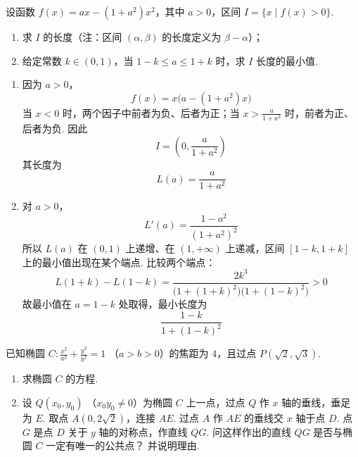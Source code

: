 \begin{problem}
设函数 \( f(x) = ax - (1 + a^2)x^2 \)，其中 \( a > 0 \)，区间 \( I = \{x \mid f(x) > 0\} \).
\begin{enumerate}
\item 求 \(I\) 的长度（注：区间 \((\alpha, \beta)\) 的长度定义为 \(\beta - \alpha\)）；
\item 给定常数 \(k \in (0,1)\)，当 \(1 - k \leqslant a \leqslant 1 + k\) 时，求 \(I\) 长度的最小值.
\end{enumerate}
\end{problem}

\begin{solution}
\begin{enumerate}
\item 因为 \(a>0\)，
\[
f(x)=x\bigl(a-(1+a^2)x\bigr)
\]
当 \(x<0\) 时，两个因子中前者为负、后者为正；当 \(x>\frac{a}{1+a^2}\) 时，前者为正、后者为负. 因此
\[
I=\left(0,\frac{a}{1+a^2}\right)
\]
其长度为
\[
L(a)=\frac{a}{1+a^2}
\]

\item 对 \(a>0\)，
\[
L'(a)=\frac{1-a^2}{(1+a^2)^2}
\]
所以 \(L(a)\) 在 \((0,1)\) 上递增、在 \((1,+\infty)\) 上递减，区间 \([1-k,1+k]\) 上的最小值出现在某个端点. 比较两个端点：
\[
L(1+k)-L(1-k)
=\frac{2k^3}{\bigl(1+(1+k)^2\bigr)\bigl(1+(1-k)^2\bigr)}>0
\]
故最小值在 \(a=1-k\) 处取得，最小长度为
\[
\frac{1-k}{1+(1-k)^2}
\]
\end{enumerate}
\end{solution}

\begin{problem}
已知椭圆 \(C: \frac{x^2}{a^2} + \frac{y^2}{b^2} = 1 \) （\(a > b > 0\)）的焦距为 \(4\)，且过点 \(P(\sqrt{2}, \sqrt{3})\).
\begin{enumerate}
\item 求椭圆 \(C\) 的方程.
\item 设 \(Q(x_0, y_0) \) （\(x_0 y_0 \neq 0\)）为椭圆 \(C\) 上一点，过点 \(Q\) 作 \(x\) 轴的垂线，垂足为 \(E\). 取点 \(A(0, 2\sqrt{2})\)，连接 \(AE\). 过点 \(A\) 作 \(AE\) 的垂线交 \(x\) 轴于点 \(D\). 点 \(G\) 是点 \(D\) 关于 \(y\) 轴的对称点，作直线 \(QG\). 问这样作出的直线 \(QG\) 是否与椭圆 \(C\) 一定有唯一的公共点？ 并说明理由.
\end{enumerate}
\end{problem}

